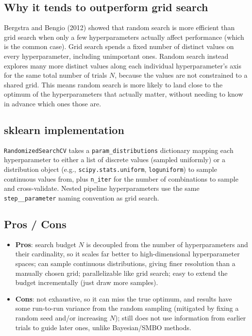 \documentclass[conference]{IEEEtran}
\begin{document}
\subsection*{Why it tends to outperform grid search}
Bergstra and Bengio (2012) showed that random search is more efficient than grid search when only a few hyperparameters actually affect performance (which is the common case). Grid search spends a fixed number of distinct values on every hyperparameter, including unimportant ones. Random search instead explores many more distinct values along each individual hyperparameter's axis for the same total number of trials $N$, because the values are not constrained to a shared grid. This means random search is more likely to land close to the optimum of the hyperparameters that actually matter, without needing to know in advance which ones those are.

\subsection*{sklearn implementation}
\texttt{RandomizedSearchCV} takes a \texttt{param\_distributions} dictionary mapping each hyperparameter to either a list of discrete values (sampled uniformly) or a distribution object (e.g., \texttt{scipy.stats.uniform}, \texttt{loguniform}) to sample continuous values from, plus \texttt{n\_iter} for the number of combinations to sample and cross-validate. Nested pipeline hyperparameters use the same \texttt{step\_\_parameter} naming convention as grid search.

\subsection*{Pros / Cons}
\begin{itemize}
    \item \textbf{Pros}: search budget $N$ is decoupled from the number of hyperparameters and their cardinality, so it scales far better to high-dimensional hyperparameter spaces; can sample continuous distributions, giving finer resolution than a manually chosen grid; parallelizable like grid search; easy to extend the budget incrementally (just draw more samples).
    \item \textbf{Cons}: not exhaustive, so it can miss the true optimum, and results have some run-to-run variance from the random sampling (mitigated by fixing a random seed and/or increasing $N$); still does not use information from earlier trials to guide later ones, unlike Bayesian/SMBO methods.
\end{itemize}
\end{document}

